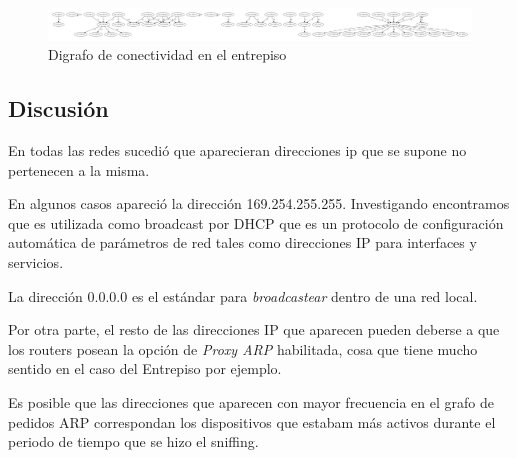 \begin{figure}[H]
	\includegraphics[width=1.0\textwidth]{resultados/entrepiso/conectividad.pdf}
	\caption{Digrafo de conectividad en el entrepiso}
\end{figure}


\subsection{Discusi\'on}

        En todas las redes sucedi\'o que aparecieran direcciones ip que se supone
no pertenecen a la misma. 

        En algunos casos apareci\'o la direcci\'on 169.254.255.255. Investigando
encontramos que es utilizada como broadcast por DHCP que es un protocolo de 
configuraci\'on autom\'atica de par\'ametros de red tales como direcciones IP
para interfaces y servicios.

        La direcci\'on 0.0.0.0 es el est\'andar para \emph{broadcastear} dentro
de una red local.

        Por otra parte, el resto de las direcciones IP que aparecen pueden deberse
a que los routers posean la opci\'on de \emph{Proxy ARP} habilitada, cosa que tiene 
mucho sentido en el caso del Entrepiso por ejemplo.

        Es posible que las direcciones que aparecen con mayor frecuencia en el grafo
de pedidos ARP correspondan los dispositivos que estabam m\'as activos durante el periodo
de tiempo que se hizo el sniffing.

